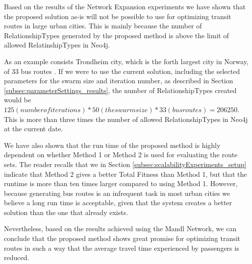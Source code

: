 Based on the results of the Network Expansion experiments we have shown that the proposed solution as-is will not be possible to use for optimizing transit routes in large urban cities. This is mainly because the number of RelationshipTypes generated by the proposed method is above the limit of allowed RelatinshipTypes in Neo4j. 

As an example consists Trondheim city, which is the forth largest city in Norway, of 33 bus routes \citep{website:atb-linjenett}. If we were to use the current solution, including the selected parameters for the swarm size and iteration number, as described in Section \vref{subsec:parameterSettings_results}, the number of RelationshipTypes created would be $125 (number of iterations) * 50 (the swarm size) * 33 (bus routes) = 206 250$. This is more than three times the number of allowed RelationshipTypes in Neo4j at the current date. 

We have also shown that the run time of the proposed method is highly dependent on whether Method 1 or Method 2 is used for evaluating the route sets. The reader recalls that we in Section \vref{subsec:scalabilityExperiments_setup} indicate that Method 2 gives a better Total Fitness than Method 1, but that the runtime is more than ten times larger compared to using Method 1. However, because generating bus routes is an infrequent task in most urban cities we believe a long run time is acceptable, given that the system creates a better solution than the one that already exists. 

Nevertheless, based on the results achieved using the Mandl Network, we can conclude that the proposed method shows great promise for optimizing transit routes in such a way that the average travel time experienced by passengers is reduced. 


